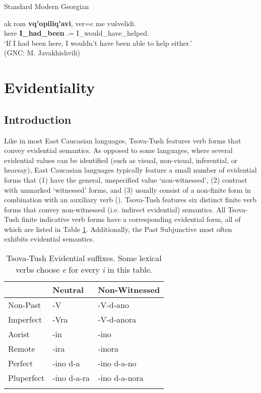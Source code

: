 	
	\begin{exe}
		\ex\label{verbflex-ex49}
		Standard Modern Georgian
        
		\gll ak rom \textbf{vq'opiliq'avi}, ver=c me vušvelidi. \\
		here {\Subord} \textbf{I\_had\_been} {\Neg}.{\Pot}={\Add} {\Fsg}  I\_would\_have\_helped. \\
		\trans `If I had been here, I wouldn't have been able to help either.' \\
		\hfill (GNC: M. Javakhishvili)
	\end{exe}



\section{Evidentiality} \label{evid}

\subsection{Introduction}

Like in most East Caucasian languages, Tsova-Tush features verb forms that convey evidential semantics. As opposed to some languages, where several evidential values can be identified (such as visual, non-visual, inferential, or hearsay), East Caucasian languages typically feature a small number of evidential forms that (1) have the general, unspecified value `non-witnessed', (2) contrast with unmarked `witnessed' forms, and (3) usually consist of a non-finite form in combination with an auxiliary verb (\cite{verhees19,forker18}). Tsova-Tush features six distinct finite verb forms that convey  non-witnessed (i.e. indirect evidential) semantics. All Tsova-Tush finite indicative verb forms have a corresponding evidential form, all of which are listed in Table \ref{table-evid}. Additionally, the Past Subjunctive most often exhibits evidential semantics.


\begin{table}
	\begin{tabular}{lll}
		\lsptoprule
		& Neutral & Non-Witnessed \\
        \midrule
		Non-Past	& -V & -V-d-ano \\
		Imperfect & -Vra & -V-d-anora \\
		Aorist	& -in	& -ino \\
		Remote	& -ira	& -inora \\
		Perfect	& -ino d-a	& -ino d-a-no \\
		Pluperfect	& -ino d-a-ra	& -ino d-a-nora \\
		\lspbottomrule
	\end{tabular}
	\caption{Tsova-Tush Evidential suffixes. Some lexical verbs choose \textit{e} for every \textit{i} in this table.}
	\label{table-evid}
\end{table}

